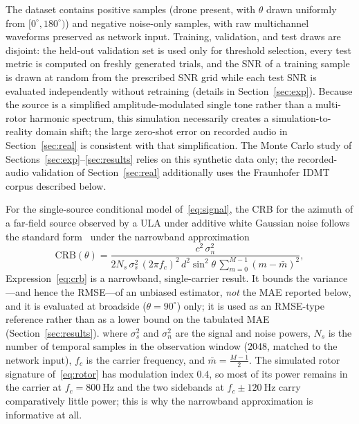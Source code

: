 \documentclass[sensors,article,submit,pdftex,moreauthors]{Definitions/mdpi}
\begin{document}
The dataset contains positive samples (drone present, with $\theta$ drawn uniformly from $[0^\circ,180^\circ)$) and negative noise-only samples, with raw multichannel waveforms preserved as network input. Training, validation, and test draws are disjoint: the held-out validation set is used only for threshold selection, every test metric is computed on freshly generated trials, and the SNR of a training sample is drawn at random from the prescribed SNR grid while each test SNR is evaluated independently without retraining (details in Section~\ref{sec:exp}). Because the source is a simplified amplitude-modulated single tone rather than a multi-rotor harmonic spectrum, this simulation necessarily creates a simulation-to-reality domain shift; the large zero-shot error on recorded audio in Section~\ref{sec:real} is consistent with that simplification. The Monte Carlo study of Sections~\ref{sec:exp}--\ref{sec:results} relies on this synthetic data only; the recorded-audio validation of Section~\ref{sec:real} additionally uses the Fraunhofer IDMT corpus described below.

For the single-source conditional model of~\eqref{eq:signal}, the CRB for the azimuth of a far-field source observed by a ULA under additive white Gaussian noise follows the standard form~\cite{stoica1989music} under the narrowband approximation
\begin{equation}
    \mathrm{CRB}(\theta)=\frac{c^{2}\,\sigma_n^{2}}{2 N_s\,\sigma_s^{2}\,(2\pi f_c)^{2}\,d^{2}\sin^{2}\theta\,\textstyle\sum_{m=0}^{M-1}(m-\bar m)^{2}},
    \label{eq:crb}
\end{equation}
Expression~\eqref{eq:crb} is a narrowband, single-carrier result. It bounds the variance---and hence the RMSE---of an unbiased estimator, \emph{not} the MAE reported below, and it is evaluated at broadside ($\theta=90^\circ$) only; it is used as an RMSE-type reference rather than as a lower bound on the tabulated MAE (Section~\ref{sec:results}).
where $\sigma_s^{2}$ and $\sigma_n^{2}$ are the signal and noise powers, $N_s$ is the number of temporal samples in the observation window (2048, matched to the network input), $f_c$ is the carrier frequency, and $\bar m=\frac{M-1}{2}$. The simulated rotor signature of~\eqref{eq:rotor} has modulation index $0.4$, so most of its power remains in the carrier at $f_c=\SI{800}{\hertz}$ and the two sidebands at $f_c\pm\SI{120}{\hertz}$ carry comparatively little power; this is why the narrowband approximation is informative at all.
\end{document}
